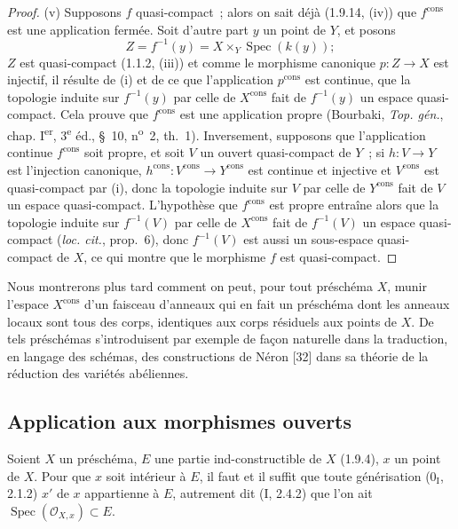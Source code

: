 \begin{proof}
(v) Supposons $f$ quasi-compact~; alors on sait déjà (1.9.14, (iv)) que
$f^{\mathrm{cons}}$ est une application fermée. Soit d'autre part $y$ un
point de $Y$, et posons
\[
  Z=f^{-1}(y)=X\times_Y\operatorname{Spec}(k(y));
\]
$Z$ est quasi-compact (1.1.2, (iii)) et comme le morphisme canonique
$p:Z\to X$ est injectif, il résulte de (i) et de ce que l'application
$p^{\mathrm{cons}}$ est continue, que la topologie induite sur $f^{-1}(y)$
par celle de $X^{\mathrm{cons}}$ fait de $f^{-1}(y)$ un espace quasi-compact.
Cela prouve que $f^{\mathrm{cons}}$ est une application propre (Bourbaki,
\emph{Top. gén.}, chap. I\textsuperscript{er}, 3\textsuperscript{e} éd.,
\S~10, n\textsuperscript{o}~2, th.~1). Inversement, supposons que
l'application continue $f^{\mathrm{cons}}$ soit propre, et soit $V$ un ouvert
quasi-compact de $Y$~; si $h:V\to Y$ est l'injection canonique,
$h^{\mathrm{cons}}:V^{\mathrm{cons}}\to Y^{\mathrm{cons}}$ est continue et
injective et $V^{\mathrm{cons}}$ est quasi-compact par (i), donc la topologie
induite sur $V$ par celle de $Y^{\mathrm{cons}}$ fait de $V$ un espace
quasi-compact. L'hypothèse que $f^{\mathrm{cons}}$ est propre entraîne alors
que la topologie induite sur $f^{-1}(V)$ par celle de $X^{\mathrm{cons}}$ fait
de $f^{-1}(V)$ un espace quasi-compact (\emph{loc. cit.}, prop.~6), donc
$f^{-1}(V)$ est aussi un sous-espace quasi-compact de $X$, ce qui montre que
le morphisme $f$ est quasi-compact.
\end{proof}

\begin{env}[1.9.16]
\label{IV.1.9.16-fr}
Nous montrerons plus tard comment on peut, pour tout préschéma $X$, munir
l'espace $X^{\mathrm{cons}}$ d'un faisceau d'anneaux qui en fait un préschéma
dont les anneaux locaux sont tous des corps, identiques aux corps résiduels aux
points de $X$. De tels préschémas s'introduisent par exemple de façon naturelle
dans la traduction, en langage des schémas, des constructions de
Néron [32] dans sa théorie de la réduction des variétés abéliennes.
\end{env}


\subsection{Application aux morphismes ouverts}
\label{subsection:IV.1.10-fr}

\begin{theorem}[1.10.1]
\label{IV.1.10.1-fr}
Soient $X$ un préschéma, $E$ une partie ind-constructible de $X$ (1.9.4), $x$
un point de $X$. Pour que $x$ soit intérieur à $E$, il faut et il suffit que
toute générisation ($0_{\mathrm I}$, 2.1.2) $x'$ de $x$ appartienne à $E$,
autrement dit (I, 2.4.2) que l'on ait
$\operatorname{Spec}(\mathcal O_{X,x})\subset E$.
\end{theorem}

